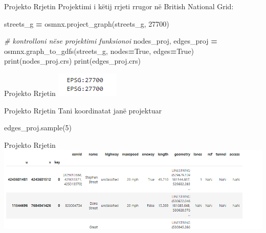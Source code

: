 \documentclass[
  ignorenonframetext,
]{beamer}
\newenvironment{Shaded}{\begin{snugshade}}{\end{snugshade}}
\newcommand{\BuiltInTok}[1]{#1}
\newcommand{\CommentTok}[1]{\textcolor[rgb]{0.56,0.35,0.01}{\textit{#1}}}
\newcommand{\DecValTok}[1]{\textcolor[rgb]{0.00,0.00,0.81}{#1}}
\newcommand{\NormalTok}[1]{#1}
\newcommand{\OperatorTok}[1]{\textcolor[rgb]{0.81,0.36,0.00}{\textbf{#1}}}
\newcommand{\VariableTok}[1]{\textcolor[rgb]{0.00,0.00,0.00}{#1}}
\begin{document}
\begin{frame}[fragile]{Projekto Rrjetin}
\protect\hypertarget{projekto-rrjetin-2}{}
Projektimi i këtij rrjeti rrugor në British National Grid:


\begin{Shaded}
\begin{Highlighting}[]
\NormalTok{streets\_g }\OperatorTok{=}\NormalTok{ osmnx.project\_graph(streets\_g, }\DecValTok{27700}\NormalTok{)}

\CommentTok{\# kontrolloni nëse projektimi funksionoi}
\NormalTok{nodes\_proj, edges\_proj }\OperatorTok{=}\NormalTok{ osmnx.graph\_to\_gdfs(streets\_g, nodes}\OperatorTok{=}\VariableTok{True}\NormalTok{, edges}\OperatorTok{=}\VariableTok{True}\NormalTok{)}
\BuiltInTok{print}\NormalTok{(nodes\_proj.crs)}
\BuiltInTok{print}\NormalTok{(edges\_proj.crs)}
\end{Highlighting}
\end{Shaded}
\end{frame}

\begin{frame}{Projekto Rrjetin}
\protect\hypertarget{projekto-rrjetin-3}{}
\includegraphics{./Figs/rrjetikor2.png}
\end{frame}

\begin{frame}[fragile]{Projekto Rrjetin}
\protect\hypertarget{projekto-rrjetin-4}{}
Tani koordinatat janë projektuar


\begin{Shaded}
\begin{Highlighting}[]
\NormalTok{edges\_proj.sample(}\DecValTok{5}\NormalTok{)}
\end{Highlighting}
\end{Shaded}
\end{frame}

\begin{frame}{Projekto Rrjetin}
\protect\hypertarget{projekto-rrjetin-5}{}
\includegraphics{./Figs/rrjetikor3.png}
\end{frame}
\end{document}
